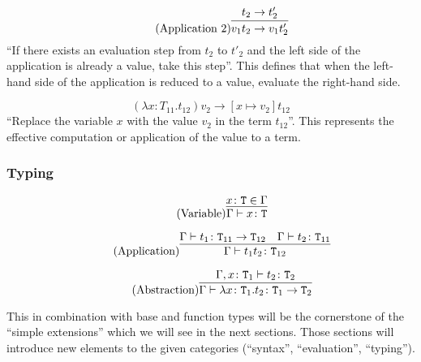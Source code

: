\begin{equation*}
    \tag{Application 2}
    \infer{
        v_1 t_2 \rightarrow v_1 t'_2
    }{
        t_2 \rightarrow t'_2
    }
\end{equation*}
``If there exists an evaluation step from $t_2$ to $t'_2$ and the left
side of the application is already a value, take this step''. This defines
that when the left-hand side of the application is reduced to a value, evaluate
the right-hand side.

\begin{equation*}
    \tag{Application Abstraction}
    (\lambda x \colon T_{11} . t_{12}) v_2 \rightarrow [x \mapsto v_2] t_{12}
\end{equation*}
``Replace the variable $x$ with the value $v_2$ in the term $t_{12}$''. This represents
the effective computation or application of the value to a term.

\subsubsection{Typing}
\begin{equation*}
    \tag{Variable}
    \infer{
        \Gamma \vdash x \colon \texttt{T}
    }{
        x \colon \texttt{T} \in \Gamma
    }
\end{equation*}

\begin{equation*}
    \tag{Application}
    \infer{
        \Gamma \vdash t_1 t_2 \colon \texttt{T}_{12}
    }{
        \Gamma \vdash t_1 \colon \texttt{T}_{11} \rightarrow \texttt{T}_{12}
        &
        \Gamma \vdash t_2 \colon \texttt{T}_{11}
    }
\end{equation*}

\begin{equation*}
    \tag{Abstraction}
    \infer{
        \Gamma \vdash \lambda x \colon \texttt{T}_1 . t_2 \colon \texttt{T}_1 \rightarrow \texttt{T}_2
    }{
        \Gamma,x \colon \texttt{T}_1 \vdash t_2 \colon \texttt{T}_2
    }
\end{equation*}

This in combination with base and function types will be the
cornerstone of the ``simple extensions'' which we will see in the
next sections. Those sections will introduce new elements to the given
categories (``syntax'', ``evaluation'', ``typing'').
